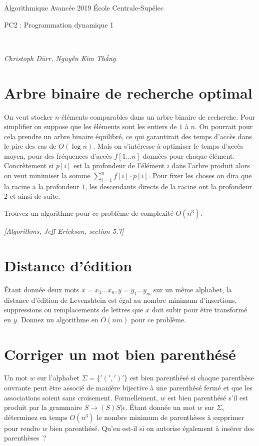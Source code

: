 \documentclass[12pt]{article}
\newcommand{\source}[1]{\begin{flushright}\emph{[#1]}\end{flushright}}
\newcommand{\MakeScribeTop}[1]{
\noindent
\begin{framed}
\noindent
 Algorithmique Avancée 2019
 \hfill
 École Centrale-Supélec
 \\[1em]
 \centerline{ \Large
#1
 }
 \\[1em]
\centerline{  \it Christoph Dürr, Nguyễn Kim Thắng}
\end{framed}
}
\begin{document}
    \MakeScribeTop{PC2 : Programmation dynamique 1}

    \section{Arbre binaire de recherche optimal}

    On veut stocker $n$ éléments comparables dans un arbre binaire de recherche.
    Pour simplifier on suppose que les éléments sont les entiers de $1$ à $n$.
    On pourrait pour cela prendre un arbre binaire équilibré, ce qui garantirait des temps d'accès dans le pire des cas de $O(\log n)$.  Mais on s'intéresse à optimiser le temps d'accès moyen, pour des fréquences d'accès $f[1\ldots n]$ données pour chaque élément.
    Concrètement si $p[i]$ est la profondeur de l'élément $i$ dans l'arbre produit alors on veut minimiser la somme $\sum_{i=1}^n f[i]\cdot p[i]$.
    Pour fixer les choses on dira que la racine a la profondeur $1$, les descendants directs de la racine ont la profondeur $2$ et ainsi de suite.

    Trouvez un algorithme pour ce problème de complexité $O(n^3)$.

\source{Algorithms, Jeff Erickson, section 5.7}

\section{Distance d'édition}

Étant donnée deux mots $x=x_1 \ldots x_n,y=y_1\ldots y_m$ sur un même alphabet, la distance d'édition de Levenshtein est égal au nombre minimum d'insertions, suppressions ou remplacements de lettres que $x$ doit subir pour être transformé en $y$.  Donnez un algorithme en $O(n m)$ pour ce problème.

\section{Corriger un mot bien parenthésé}

Un mot $w$ sur l'alphabet $\Sigma=\{'(',')'\}$  est bien parenthésé si chaque parenthèse ouvrante peut être associé de manière bijective à une parenthésé fermé et que les associations soient sans croisement.  Formellement, $w$ est bien parenthésé s'il est produit par la grammaire $S\rightarrow (S)S | \epsilon $.  Étant donnée un mot $w$ sur $\Sigma$, déterminez en temps $O(n^3)$ le nombre minimum de parenthèses à supprimer pour rendre $w$ bien parenthésé. Qu'en est-il si on autorise également à insérer des parenthèses~?
\end{document}
